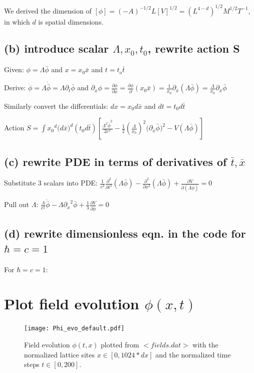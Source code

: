 \documentclass{article}
\begin{document}
\vspace{3mm}
We derived the dimension of 
$[\phi]=(-A)^{-1/2}L[V]^{1/2}=(L^{4-d})^{1/2}M^{1/2}T^{-1}$, in which $d$ is spatial dimensions.

\subsection{(b) introduce scalar $\Lambda, x_0, t_0$, rewrite action S}

Given: $\phi=\Lambda{\bar{\phi}}$ and $x=x_0{\bar{x}}$ and $t=t_o{\bar{t}}$

\vspace{3mm}
Derive: $\dot{\phi}=\Lambda{\dot{\bar\phi}}=\Lambda{\partial_t}{\bar\phi}$ and $\partial_x{\phi}=\frac{\partial\phi}{\partial{x}}=\frac{\partial\phi}{\partial}{{(x_0\bar{x})}}=\frac{1}{x_0}{\partial_\bar{x}}{(\Lambda{\bar\phi})}=\frac{\Lambda}{x_0}{\partial_\bar{x}}{\bar\phi}$

\vspace{3mm}
Similarly convert the differentials: $dx=x_0{d\bar{x}}$ and $dt=t_0{d\bar{t}}$

\vspace{3mm}
Action $S=\int{{x_0}^d{(d\bar{x}})^d{(t_0{d\bar{t}})}[\frac{\Lambda^2{\dot{\bar{\phi}}}^2}{2c^2}-\frac{1}{2}{(\frac{\Lambda}{x_0})^2(\partial_{\bar{x}}{\bar\phi}})^2-V(\Lambda\bar\phi)]}$

\subsection{(c) rewrite PDE in terms of  derivatives of $\bar{t}, \bar{x}$}
Substitute 3 scalars into PDE: $\frac{1}{c^2}{\frac{\partial^2}{\partial{t^2}}(\Lambda\bar\phi)}-\frac{\partial^2}{\partial{x^2}}(\Lambda\bar\phi)+\frac{\partial{V}}{\partial(\Lambda\bar\phi)}=0$

\vspace{3mm}
Pull out $\Lambda$: $\frac{\Lambda}{c^2}{\ddot{\bar\phi}}-{\Lambda{\partial_x}^2}{\bar\phi}+\frac{1}{\lambda}{\frac{\partial{V}}{\partial\bar\phi}}=0$


\subsection{(d) rewrite dimensionless eqn. in the code for  $\hbar=c=1$}
For $\hbar=c=1$: 

\section{Plot field evolution $\phi(x, t)$}
\begin{figure}[H]
    \centering
    \texttt{[image: Phi\_evo\_default.pdf]}
    \caption{Field evolution $\phi(t, x)$ plotted from $<fields.dat>$ with the normalized lattice sites $x\in{[0, 1024*dx]}$ and the normalized time steps $t\in{[0, 200]}$.}
    \label{fig:Q3}
\end{figure}
\end{document}
